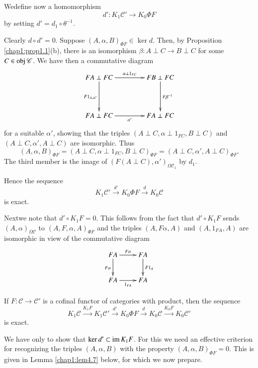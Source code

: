 We\pageoriginale define now a homomorphism 
$$
d' : K_1 \mathscr{C}' \to K_0 \Phi F 
$$
by setting $d' = d_1 \circ \theta^{-1}$.

Clearly $d \circ d' = 0$. Suppose $(A, \alpha, B)_{\Phi F} \in \ker
d$. Then, by Proposition \ref{chap1:prop1.1}(b), there is an
isomorphism $\beta : A 
\perp C \to B \perp C$ for some $C \in  \operatorname{obj} \mathscr{C}$. We have
then a commutative diagram  
\[
\xymatrix@R=1.5cm@C=1.5cm{
FA \perp FC \ar[r]^{\alpha \perp 1_{FC}} \ar[d]_{F 1_{A\perp C}} & FB
\perp FC \ar[d]^{F \beta^{-1}}\\
FA \perp FC \ar[r]_{\alpha'} & FA \perp FC
}
\]
for a suitable $\alpha'$, showing that the triples $(A \perp C, \alpha
\perp 1_{FC}, B \perp C)$ and $(A \perp C, \alpha', A \perp C)$ are
isomorphic. Thus  
$$
(A, \alpha, B)_{\Phi  F} = (A \perp C, \alpha \perp 1_{FC}, B \perp
C)_{\Phi F} = (A \perp C, \alpha', A \perp C)_{\Phi F}. 
$$
The third member is the image of $(F(A \perp C), \alpha')_{\Omega
  \mathscr{C}_1}$ by $d_1$.  

Hence the sequence 
$$
K_1 \mathscr{C}' \xrightarrow{d'} K_0 \Phi F \xrightarrow{d} K_0
\mathscr{C} 
$$
is exact.

Next\pageoriginale we note that $d' \circ K_1 F = 0$. This follows from
the fact that 
$d' \circ K_1 F$ sends $(A, \alpha)_{\Omega \mathscr{C}}$ to $(A, F,
\alpha, A)_{\Phi F}$ and the triples $(A, F \alpha, A)$ and $(A,
1_{FA}, A)$ are isomorphic in view of the commutative diagram 
\[
\xymatrix{
FA \ar[r]^{F \alpha} \ar[d]_{F \alpha} & FA \ar[d]^{F1_A} \\
FA  \ar[r]_{1_{FA}} & FA
}
\]

\setcounter{theorem}{5}
\begin{theorem}\label{chap1:thm4.6}%
If $F : \mathscr{C} \to \mathscr{C}'$ is a cofinal functor of
categories with product, then the sequence  
$$
K_1 \mathscr{C} \xrightarrow{K_1 F} K_1 \mathscr{C}' \xrightarrow{d'}
K_0 \Phi F \xrightarrow{d} K_0 \mathscr{C} \xrightarrow{K_0 F} K_0
\mathscr{C}' 
$$
is exact.
\end{theorem}

We have only to show that $\ker d' \subset \operatorname{im} K_1 F$. For this we need
an effective criterion for recognizing the triples $(A, \alpha, B)$
with the property $(A, \alpha, B)_{{\Phi} F} = 0$. This is given in
Lemma \ref{chap1:lem4.7} below, for which we now prepare. 

